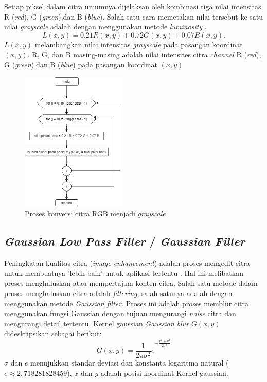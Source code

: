 Setiap piksel dalam citra umumnya dijelaksan oleh kombinasi tiga nilai intensitas R (\emph{red}), G (\emph{green}),dan B (\emph{blue}). Salah satu cara memetakan nilai tersebut ke satu nilai \emph{grayscale} adalah dengan menggunakan metode \emph{luminosity} \citep{kumar2016gray}.
\begin{equation}
	\label{luminosity}
	L(x,y) = 0.21 R (x,y) + 0.72 G (x,y) + 0.07 B (x,y).
\end{equation}
$L(x,y)$ melambangkan nilai intensitas \emph{grayscale} pada pasangan koordinat $(x, y)$. R, G, dan B masing-masing adalah nilai intensites citra \emph{channel} R (\emph{red}), G (\emph{green}),dan B (\emph{blue}) pada pasangan koordinat $(x,y)$

\begin{figure}[H]
	\centering
	\includegraphics[width=0.45\textwidth]{diagram/grayscale}
	\caption{Proses konversi citra RGB menjadi \emph{grayscale}}
	\label{Gambar:grayscalediagram}
\end{figure}

\subsection{\emph{Gaussian Low Pass Filter} / \emph{Gaussian Filter}}
Peningkatan kualitas citra (\emph{image enhancement}) adalah proses mengedit citra untuk membuatnya 'lebih baik' untuk aplikasi tertentu \citep{tyagi2018understanding}. Hal ini melibatkan proses menghaluskan atau mempertajam konten citra. Salah satu metode dalam proses menghaluskan citra adalah \emph{filtering}, salah satunya adalah dengan menggunakan metode \emph{Gaussian filter}. Proses ini adalah proses memblur citra menggunakan fungsi Gaussian dengan tujuan mengurangi \emph{noise} citra dan mengurangi detail tertentu. Kernel gaussian \emph{Gaussian blur} $G(x,y)$ dideskripsikan sebagai berikut:
\begin{equation}
\label{gaussblur}
G(x,y) = {\frac{1}{2 \pi \sigma^2} e}^{-{\frac{x^2+y^2}{2 \sigma^2}}}
\end{equation}
$\sigma$ dan $e$ menujukkan standar deviasi dan konstanta logaritma natural ($e \approx 2,718281828459$), $x$ dan $y$ adalah posisi koordinat Kernel gaussian.



